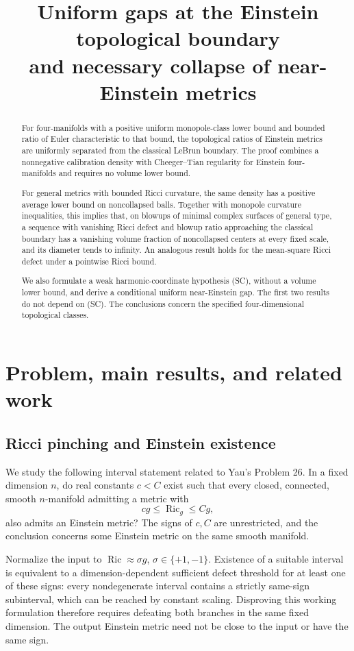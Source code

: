 \documentclass[a4paper,11pt]{article}
\title{Uniform gaps at the Einstein topological boundary\\[2mm]\large and necessary collapse of near-Einstein metrics}
\author{}
\date{}
\theoremstyle{paper}
\DeclareMathOperator{\Ric}{Ric}
\numberwithin{equation}{section}
\begin{document}
\maketitle
\begin{abstract}
For four-manifolds with a positive uniform monopole-class lower bound and bounded ratio of Euler characteristic to that bound, the topological ratios of Einstein metrics are uniformly separated from the classical LeBrun boundary. The proof combines a nonnegative calibration density with Cheeger--Tian regularity for Einstein four-manifolds and requires no volume lower bound.

For general metrics with bounded Ricci curvature, the same density has a positive average lower bound on noncollapsed balls. Together with monopole curvature inequalities, this implies that, on blowups of minimal complex surfaces of general type, a sequence with vanishing Ricci defect and blowup ratio approaching the classical boundary has a vanishing volume fraction of noncollapsed centers at every fixed scale, and its diameter tends to infinity. An analogous result holds for the mean-square Ricci defect under a pointwise Ricci bound.

We also formulate a weak harmonic-coordinate hypothesis (SC), without a volume lower bound, and derive a conditional uniform near-Einstein gap. The first two results do not depend on (SC). The conclusions concern the specified four-dimensional topological classes.
\end{abstract}
\tableofcontents

\section{Problem, main results, and related work}

\subsection{Ricci pinching and Einstein existence}

We study the following interval statement related to Yau's Problem 26. In a fixed dimension $n$, do real constants $c<C$ exist such that every closed, connected, smooth $n$-manifold admitting a metric with
\[
cg\le\Ric_g\le Cg,
\]
also admits an Einstein metric? The signs of $c,C$ are unrestricted, and the conclusion concerns some Einstein metric on the same smooth manifold.

Normalize the input to $\Ric\approx\sigma g$, $\sigma\in\{+1,-1\}$. Existence of a suitable interval is equivalent to a dimension-dependent sufficient defect threshold for at least one of these signs: every nondegenerate interval contains a strictly same-sign subinterval, which can be reached by constant scaling. Disproving this working formulation therefore requires defeating both branches in the same fixed dimension. The output Einstein metric need not be close to the input or have the same sign.
\end{document}
